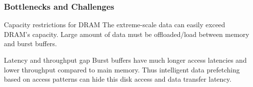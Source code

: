 \documentclass{beamer}
\begin{document}
\begin{frame}
\frametitle{Bottlenecks and Challenges}
\begin{block}{Capacity restrictions for DRAM}
The extreme-scale data can easily exceed DRAM's capacity. Large amount of data must be offloaded/load between memory and burst buffers.
\end{block}

\begin{block}{Latency and throughput gap}
Burst buffers have much longer access latencies and lower throughput compared to main memory. Thus intelligent data prefetching based on access patterns can hide this disk access and data transfer latency.
\end{block}
\end{frame}
\end{document}
